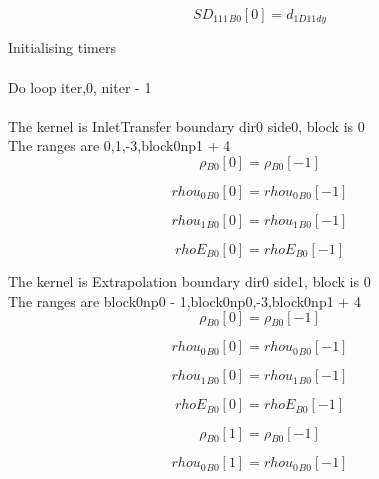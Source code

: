 \documentclass{article}
\begin{document}
\begin{dmath}{SD_{111}{_{B0}}}[{0}] = d_{1 D11 dy}\end{dmath}

\noindent Initialising timers\\
\\\noindent Do loop iter,0, niter - 1\\
\\\noindent The kernel is InletTransfer boundary dir0 side0, block is 0\\\noindent The ranges are 0,1,-3,block0np1 + 4\\\begin{dmath}{\rho{_{B0}}}[{0}] = {\rho{_{B0}}}[{-1}]\end{dmath}

\begin{dmath}{rhou_{0}{_{B0}}}[{0}] = {rhou_{0}{_{B0}}}[{-1}]\end{dmath}

\begin{dmath}{rhou_{1}{_{B0}}}[{0}] = {rhou_{1}{_{B0}}}[{-1}]\end{dmath}

\begin{dmath}{rhoE{_{B0}}}[{0}] = {rhoE{_{B0}}}[{-1}]\end{dmath}

\noindent The kernel is Extrapolation boundary dir0 side1, block is 0\\\noindent The ranges are block0np0 - 1,block0np0,-3,block0np1 + 4\\\begin{dmath}{\rho{_{B0}}}[{0}] = {\rho{_{B0}}}[{-1}]\end{dmath}

\begin{dmath}{rhou_{0}{_{B0}}}[{0}] = {rhou_{0}{_{B0}}}[{-1}]\end{dmath}

\begin{dmath}{rhou_{1}{_{B0}}}[{0}] = {rhou_{1}{_{B0}}}[{-1}]\end{dmath}

\begin{dmath}{rhoE{_{B0}}}[{0}] = {rhoE{_{B0}}}[{-1}]\end{dmath}

\begin{dmath}{\rho{_{B0}}}[{1}] = {\rho{_{B0}}}[{-1}]\end{dmath}

\begin{dmath}{rhou_{0}{_{B0}}}[{1}] = {rhou_{0}{_{B0}}}[{-1}]\end{dmath}
\end{document}

